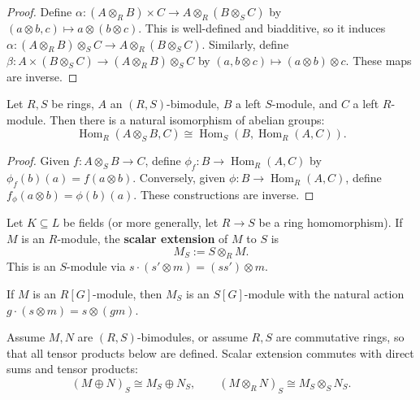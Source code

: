 \begin{proof}
Define \(\alpha: (A \otimes_R B) \times C \to A \otimes_R (B \otimes_S C)\) by \((a \otimes b, c) \mapsto a \otimes (b \otimes c)\). This is well-defined and biadditive, so it induces \(\alpha: (A \otimes_R B) \otimes_S C \to A \otimes_R (B \otimes_S C)\). Similarly, define \(\beta: A \times (B \otimes_S C) \to (A \otimes_R B) \otimes_S C\) by \((a, b \otimes c) \mapsto (a \otimes b) \otimes c\). These maps are inverse.
\end{proof}



\begin{thm}
Let \(R, S\) be rings, \(A\) an \((R,S)\)-bimodule, \(B\) a left \(S\)-module, and \(C\) a left \(R\)-module. Then there is a natural isomorphism of abelian groups:
\[
\operatorname{Hom}_R(A \otimes_S B, C) \cong \operatorname{Hom}_S(B, \operatorname{Hom}_R(A, C)).
\]
\end{thm}

\begin{proof}
Given \(f: A \otimes_S B \to C\), define \(\phi_f: B \to \operatorname{Hom}_R(A, C)\) by \(\phi_f(b)(a) = f(a \otimes b)\). Conversely, given \(\phi: B \to \operatorname{Hom}_R(A, C)\), define \(f_\phi(a \otimes b) = \phi(b)(a)\). These constructions are inverse.
\end{proof}



\begin{defn}
Let \(K \subseteq L\) be fields (or more generally, let \(R \to S\) be a ring homomorphism). If \(M\) is an \(R\)-module, the \textbf{scalar extension} of \(M\) to \(S\) is
\[
M_S := S \otimes_R M.
\]
This is an \(S\)-module via \(s \cdot (s' \otimes m) = (ss') \otimes m\).
\end{defn}

\begin{remark}
If \(M\) is an \(R[G]\)-module, then \(M_S\) is an \(S[G]\)-module with the natural action \(g \cdot (s \otimes m) = s \otimes (g m)\).
\end{remark}

\begin{prop}\label{prop:scalar_extension}
Assume \(M, N\) are \((R, S)\)-bimodules, or assume \(R, S\) are commutative rings, so that all tensor products below are defined. Scalar extension commutes with direct sums and tensor products:
\[
(M \oplus N)_S \cong M_S \oplus N_S, \qquad (M \otimes_R N)_S \cong M_S \otimes_S N_S.
\]\end{prop}

